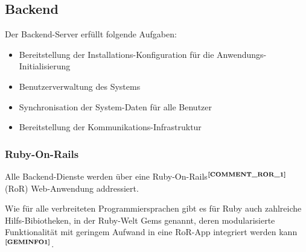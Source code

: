 \subsection{Backend}\label{5_BE}
Der Backend-Server erfüllt folgende Aufgaben:
	\begin{itemize}
		\item Bereitstellung der Installations-Konfiguration für die Anwendungs-Initialisierung
		\item Benutzerverwaltung des Systems
		\item Synchronisation der System-Daten für alle Benutzer
		\item Bereitstellung der Kommunikations-Infrastruktur
	\end{itemize}

\subsubsection{Ruby-On-Rails}
Alle Backend-Dienste werden über eine Ruby-On-Rails$^{\textbf{\ref{COMMENT_ROR_1}}}$ (RoR) Web-Anwendung addressiert.%
\addtocounter{footnote}{1}
%
Wie für alle verbreiteten Programmiersprachen gibt es für Ruby auch zahlreiche Hilfs-Bibiotheken, in der Ruby-Welt Gems genannt, deren modularisierte Funktionalität mit geringem Aufwand in eine RoR-App integriert werden kann $^{\textbf{\ref{GEMINFO1}}}$.
\addtocounter{footnote}{1}%
%

